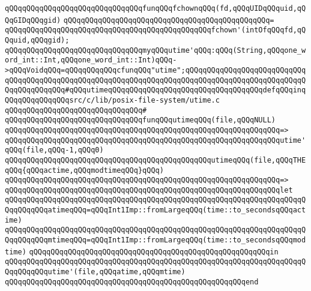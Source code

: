 \verb|qQQqqQQqqQQqqQQqqQQqqQQqqQQqqQQqfunqQQqfchownqQQq(fd,qQQqUIDqQQquid,qQQqGIDqQQqgid)|\newline
\verb|qQQqqQQqqQQqqQQqqQQqqQQqqQQqqQQqqQQqqQQqqQQqqQQq=|\newline
\verb|qQQqqQQqqQQqqQQqqQQqqQQqqQQqqQQqqQQqqQQqqQQqqQQqfchown'(intOfqQQqfd,qQQquid,qQQqgid);|\newline
\newline
\newline
\verb|qQQqqQQqqQQqqQQqqQQqqQQqqQQqqQQqmyqQQqutime'qQQq:qQQq(String,qQQqone_word_int::Int,qQQqone_word_int::Int)qQQq->qQQqVoidqQQq=qQQqqQQqqQQqcfunqQQq"utime";qQQqqQQqqQQqqQQqqQQqqQQqqQQqqQQqqQQqqQQqqQQqqQQqqQQqqQQqqQQqqQQqqQQqqQQqqQQqqQQqqQQqqQQqqQQqqQQqqQQqqQQqqQQqqQQq#qQQqutimeqQQqqQQqqQQqqQQqqQQqqQQqqQQqqQQqqQQqdefqQQqinqQQqqQQqqQQqqQQqsrc/c/lib/posix-file-system/utime.c|\newline
\verb|qQQqqQQqqQQqqQQqqQQqqQQqqQQqqQQq#|\newline
\verb|qQQqqQQqqQQqqQQqqQQqqQQqqQQqqQQqfunqQQqutimeqQQq(file,qQQqNULL)|\newline
\verb|qQQqqQQqqQQqqQQqqQQqqQQqqQQqqQQqqQQqqQQqqQQqqQQqqQQqqQQqqQQqqQQq=>|\newline
\verb|qQQqqQQqqQQqqQQqqQQqqQQqqQQqqQQqqQQqqQQqqQQqqQQqqQQqqQQqqQQqqQQqutime'qQQq(file,qQQq-1,qQQq0)|\newline
\newline
\verb|qQQqqQQqqQQqqQQqqQQqqQQqqQQqqQQqqQQqqQQqqQQqqQQqutimeqQQq(file,qQQqTHEqQQq{qQQqactime,qQQqmodtimeqQQq}qQQq)|\newline
\verb|qQQqqQQqqQQqqQQqqQQqqQQqqQQqqQQqqQQqqQQqqQQqqQQqqQQqqQQqqQQqqQQq=>|\newline
\verb|qQQqqQQqqQQqqQQqqQQqqQQqqQQqqQQqqQQqqQQqqQQqqQQqqQQqqQQqqQQqqQQqlet|\newline
\verb|qQQqqQQqqQQqqQQqqQQqqQQqqQQqqQQqqQQqqQQqqQQqqQQqqQQqqQQqqQQqqQQqqQQqqQQqqQQqqQQqatimeqQQq=qQQqInt1Imp::fromLargeqQQq(time::to_secondsqQQqactime)|\newline
\verb|qQQqqQQqqQQqqQQqqQQqqQQqqQQqqQQqqQQqqQQqqQQqqQQqqQQqqQQqqQQqqQQqqQQqqQQqqQQqqQQqmtimeqQQq=qQQqInt1Imp::fromLargeqQQq(time::to_secondsqQQqmodtime)|\newline
\verb|qQQqqQQqqQQqqQQqqQQqqQQqqQQqqQQqqQQqqQQqqQQqqQQqqQQqqQQqin|\newline
\verb|qQQqqQQqqQQqqQQqqQQqqQQqqQQqqQQqqQQqqQQqqQQqqQQqqQQqqQQqqQQqqQQqqQQqqQQqqQQqqQQqutime'(file,qQQqatime,qQQqmtime)|\newline
\verb|qQQqqQQqqQQqqQQqqQQqqQQqqQQqqQQqqQQqqQQqqQQqqQQqqQQqqQQqend|\newline
